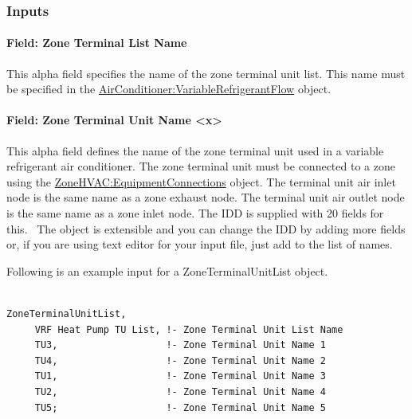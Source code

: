 \subsubsection{Inputs}\label{inputs-2-044}

\paragraph{Field: Zone Terminal List Name}\label{field-zone-terminal-list-name}

This alpha field specifies the name of the zone terminal unit list. This name must be specified in the \hyperref[airconditionervariablerefrigerantflow]{AirConditioner:VariableRefrigerantFlow} object.

\paragraph{Field: Zone Terminal Unit Name \textless{}x\textgreater{}}\label{field-zone-terminal-unit-name-x}

This alpha field defines the name of the zone terminal unit used in a variable refrigerant air conditioner. The zone terminal unit must be connected to a zone using the \hyperref[zonehvacequipmentconnections]{ZoneHVAC:EquipmentConnections} object. The terminal unit air inlet node is the same name as a zone exhaust node. The terminal unit air outlet node is the same name as a zone inlet node. The IDD is supplied with 20 fields for this.~ The object is extensible and you can change the IDD by adding more fields or, if you are using text editor for your input file, just add to the list of names.

Following is an example input for a ZoneTerminalUnitList object.

\begin{lstlisting}

ZoneTerminalUnitList,
     VRF Heat Pump TU List, !- Zone Terminal Unit List Name
     TU3,                   !- Zone Terminal Unit Name 1
     TU4,                   !- Zone Terminal Unit Name 2
     TU1,                   !- Zone Terminal Unit Name 3
     TU2,                   !- Zone Terminal Unit Name 4
     TU5;                   !- Zone Terminal Unit Name 5
\end{lstlisting}